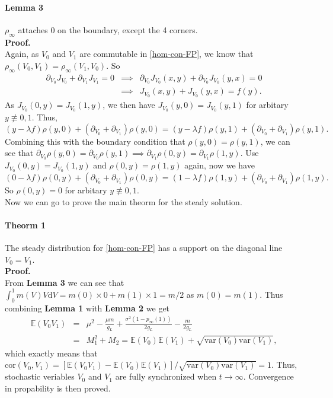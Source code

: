 \documentclass[10pt]{article}
\begin{document}
\begin{multicols}{2}
\paragraph{Lemma 3} $\rho_{\infty}$ attaches 0 on the boundary, except the 4 corners.\\
{\bf{Proof.}}\\
\indent
Again, as $V_0$ and $V_1$ are commutable in \ref{hom-con-FP}, we know that $\rho_{\infty}(V_0,V_1)=\rho_{\infty}(V_1,V_0)$. So
\begin{eqnarray}
\partial_{V_0}J_{V_0} + \partial_{V_1}J_{V_1}= 0 
&\implies& \partial_{V_0}J_{V_0}(x,y)+\partial_{V_0}J_{V_0}(y,x) = 0 \nonumber\\
&\implies& J_{V_0}(x,y)+J_{V_0}(y,x) = f(y). \nonumber
\end{eqnarray}
As $J_{V_0}(0,y)=J_{V_0}(1,y)$, we then have $J_{V_0}(y,0) = J_{V_0}(y,1)$ for arbitary $y\not\equiv 0,1$. Thus,
$$
(y-\lambda f)\rho(y,0)+(\partial_{V_0}+\partial_{V_1})\rho(y,0) = (y-\lambda f)\rho(y,1)+(\partial_{V_0}+\partial_{V_1})\rho(y,1).
$$
\indent
Combining this with the boundary condition that $\rho(y,0)=\rho(y,1)$, we can see that $\partial_{V_0}\rho(y,0) = \partial_{V_0}\rho(y,1) \implies \partial_{V_1}\rho(0,y) = \partial_{V_1}\rho(1,y)$. Use $J_{V_0}(0,y)=J_{V_0}(1,y)$ and $\rho(0,y)=\rho(1,y)$ again, now we have 
$$
(0-\lambda f)\rho(0,y)+(\partial_{V_0}+\partial_{V_1})\rho(0,y) = (1-\lambda f)\rho(1,y)+(\partial_{V_0}+\partial_{V_1})\rho(1,y).
$$
So $\rho(0,y)=0$ for arbitary $y\not\equiv 0,1$.\\
\indent
Now we can go to prove the main theorm for the steady solution.

\paragraph{Theorm 1} The steady distribution for \ref{hom-con-FP} has a support on the diagonal line $V_0 = V_1$.\\
{\bf{Proof.}}\\
From {\bf{Lemma 3}} we can see that $\int_0^1{m(V)V\mbox{d}V}=m(0)\times 0+m(1)\times 1=m/2$ as $m(0)=m(1)$. Thus combining {\bf{Lemma 1}} with {\bf{Lemma 2}} we get 
\begin{eqnarray}
\mathbb{E}(V_0V_1) 
&=& \mu^2-\frac{\mu m}{g_L}+\frac{\sigma^2(1-p_{\infty}(1))}{2g_L}-\frac{m}{2g_L} \nonumber\\
&=& M_1^2+M_2 = \mathbb{E}(V_0)\mathbb{E}(V_1)+\sqrt{\mbox{var}(V_0)\mbox{var}(V_1)},
\end{eqnarray}
which exactly means that $\mbox{cor}(V_0,V_1)=[\mathbb{E}(V_0V_1) -\mathbb{E}(V_0)\mathbb{E}(V_1)]/\sqrt{\mbox{var}(V_0)\mbox{var}(V_1)}=1$. Thus, stochastic veriables $V_0$ and $V_1$ are fully synchronized when $t\rightarrow \infty$. Convergence in propability is then proved.



\end{multicols}
\end{document}
